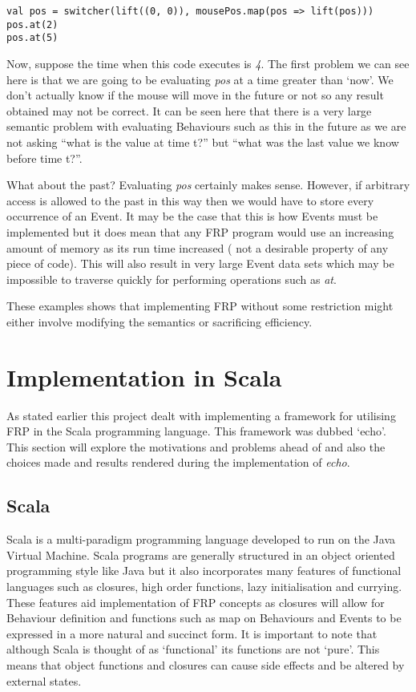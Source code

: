 \documentclass[12pt]{article}
\begin{document}
\begin{verbatim}
val pos = switcher(lift((0, 0)), mousePos.map(pos => lift(pos)))
pos.at(2)
pos.at(5)
\end{verbatim}    

      Now, suppose the time when this code executes is \emph{4}. The first problem we can see here
      is that we are going to be evaluating \emph{pos} at a time greater than `now'. We don't
      actually know if the mouse will move in the future or not so any result obtained may not
      be correct. It can be seen here that there is a very large semantic problem with evaluating
      Behaviours such as this in the future as we are not asking ``what is the value at time t?''
      but ``what was the last value we know before time t?''. 
      
      What about the past? Evaluating \emph{pos} certainly makes sense. However, if arbitrary
      access is allowed to the past in this way then we would have to store every occurrence
      of an Event. It may be the case that this is how Events must be implemented but it does
      mean that any FRP program would use an increasing amount of memory as its run time increased (
      not a desirable property of any piece of code). This will also result in very large Event data sets which
      may be impossible to traverse quickly for performing operations such as \emph{at}.
      
      These examples shows that implementing FRP without some restriction might either involve modifying the
      semantics or sacrificing efficiency.
    
  \section{Implementation in Scala}
    As stated earlier this project dealt with implementing a framework for utilising FRP in the Scala programming
    language. This framework was dubbed `echo'. This section will explore the motivations and problems ahead of
    and also the choices made and results rendered during the implementation of \emph{echo}.
    
    \subsection{Scala}
      Scala is a multi-paradigm programming language developed to run on the Java Virtual Machine. Scala programs are
      generally structured in an object oriented programming style like Java but it also incorporates many features of
      functional languages such as closures, high order functions, lazy initialisation and currying. These features aid
      implementation of FRP concepts as closures will allow for Behaviour definition and functions such as map on
      Behaviours and Events to be expressed in a more natural and succinct form. It is
      important to note that although Scala is thought of as `functional' its functions are not `pure'. This means
      that object functions and closures can cause side effects and be altered by external states.
      
\end{document}
